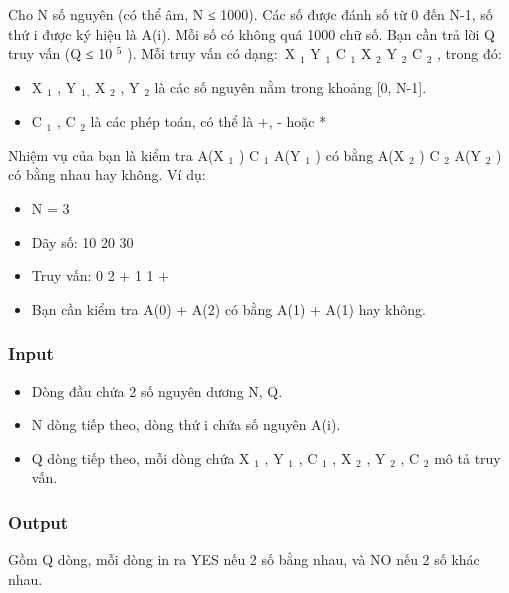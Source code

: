 



   Cho N số nguyên (có thể âm, N ≤ 1000). Các số được đánh số từ 0 đến N-1, số thứ i được ký hiệu là A(i). Mỗi số có không quá 1000 chữ số. Bạn cần trả lời Q truy vấn (Q ≤ 10   $^    5   $   ). Mỗi truy vấn có dạng: X   $_    1   $   Y   $_    1   $   C   $_    1   $   X   $_    2   $   Y   $_    2   $   C   $_    2   $   , trong đó:  
\begin{itemize}
	\item     X    $_     1    $    , Y    $_     1    $$_     ,    $    X    $_     2    $    , Y    $_     2    $    là các số nguyên nằm trong khoảng [0, N-1].   
	\item     C    $_     1    $    , C    $_     2    $    là các phép toán, có thể là +, - hoặc *   
\end{itemize}

   Nhiệm vụ của bạn là kiểm tra A(X   $_    1   $   ) C   $_    1   $   A(Y   $_    1   $   ) có bằng A(X   $_    2   $   ) C   $_    2   $   A(Y   $_    2   $   ) có bằng nhau hay không. Ví dụ:  
\begin{itemize}
	\item     N = 3   
	\item     Dãy số: 10 20 30   
	\item     Truy vấn: 0 2 + 1 1 +   
	\item     Bạn cần kiểm tra A(0) + A(2) có bằng A(1) + A(1) hay không.   
\end{itemize}

\subsubsection{   Input  }
\begin{itemize}
	\item      Dòng đầu chứa 2 số nguyên dương N, Q.    
	\item      N dòng tiếp theo, dòng thứ i chứa số nguyên A(i).    
	\item     Q dòng tiếp theo, mỗi dòng chứa X    $_     1    $    , Y    $_     1    $    , C    $_     1    $    , X    $_     2    $    , Y    $_     2    $    , C    $_     2    $    mô tả truy vấn.   
\end{itemize}

\subsubsection{   Output  }

   Gồm Q dòng, mỗi dòng in ra YES nếu 2 số bằng nhau, và NO nếu 2 số khác nhau.  

